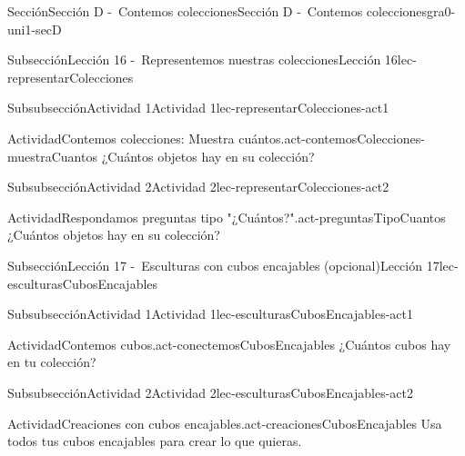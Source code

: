\begin{sectionptx}{Sección}{Sección D -~Contemos colecciones}{}{Sección D -~Contemos colecciones}{}{}{gra0-uni1-secD}
\begin{subsectionptx}{Subsección}{Lección 16 -~Representemos nuestras colecciones}{}{Lección 16}{}{}{lec-representarColecciones}
\begin{subsubsectionptx}{Subsubsección}{Actividad 1}{}{Actividad 1}{}{}{lec-representarColecciones-act1}
\begin{activity}{Actividad}{Contemos colecciones: Muestra cuántos.}{act-contemosColecciones-muestraCuantos}%
¿Cuántos objetos hay en su colección?%
\end{activity}%
\end{subsubsectionptx}
%
%
\typeout{************************************************}
\typeout{************************************************}
%
\begin{subsubsectionptx}{Subsubsección}{Actividad 2}{}{Actividad 2}{}{}{lec-representarColecciones-act2}
\begin{activity}{Actividad}{Respondamos preguntas tipo "¿Cuántos?".}{act-preguntasTipoCuantos}%
¿Cuántos objetos hay en su colección?%
\end{activity}%
\end{subsubsectionptx}
\end{subsectionptx}
%
%
\typeout{************************************************}
\typeout{************************************************}
%
\begin{subsectionptx}{Subsección}{Lección 17 -~Esculturas con cubos encajables (opcional)}{}{Lección 17}{}{}{lec-esculturasCubosEncajables}
%
%
\typeout{************************************************}
\typeout{************************************************}
%
\begin{subsubsectionptx}{Subsubsección}{Actividad 1}{}{Actividad 1}{}{}{lec-esculturasCubosEncajables-act1}
\begin{activity}{Actividad}{Contemos cubos.}{act-conectemosCubosEncajables}%
¿Cuántos cubos hay en tu colección?%
\end{activity}%
\end{subsubsectionptx}
%
%
\typeout{************************************************}
\typeout{************************************************}
%
\begin{subsubsectionptx}{Subsubsección}{Actividad 2}{}{Actividad 2}{}{}{lec-esculturasCubosEncajables-act2}
\begin{activity}{Actividad}{Creaciones con cubos encajables.}{act-creacionesCubosEncajables}%
Usa todos tus cubos encajables para crear lo que quieras.%
\end{activity}%
\end{subsubsectionptx}
\end{subsectionptx}
\end{sectionptx}
%
%

